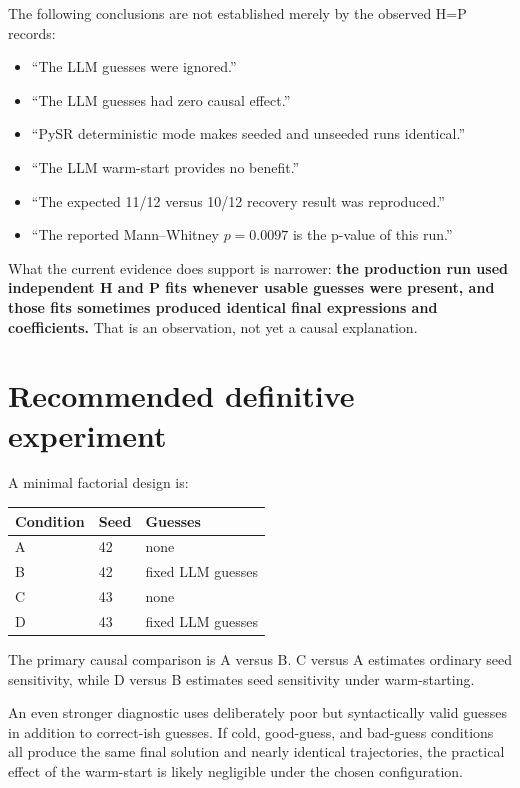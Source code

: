 \documentclass[11pt]{article}
\begin{document}
The following conclusions are not established merely by the observed H=P records:
\begin{itemize}
    \item ``The LLM guesses were ignored.''
    \item ``The LLM guesses had zero causal effect.''
    \item ``PySR deterministic mode makes seeded and unseeded runs identical.''
    \item ``The LLM warm-start provides no benefit.''
    \item ``The expected 11/12 versus 10/12 recovery result was reproduced.''
    \item ``The reported Mann--Whitney \(p=0.0097\) is the p-value of this run.''
\end{itemize}

What the current evidence does support is narrower: \textbf{the production run used independent H and P fits whenever usable guesses were present, and those fits sometimes produced identical final expressions and coefficients.} That is an observation, not yet a causal explanation.

\section{Recommended definitive experiment}

A minimal factorial design is:

\begin{center}
\begin{tabular}{lll}
\toprule
Condition & Seed & Guesses \\
\midrule
A & 42 & none \\
B & 42 & fixed LLM guesses \\
C & 43 & none \\
D & 43 & fixed LLM guesses \\
\bottomrule
\end{tabular}
\end{center}

The primary causal comparison is A versus B. C versus A estimates ordinary seed sensitivity, while D versus B estimates seed sensitivity under warm-starting.

An even stronger diagnostic uses deliberately poor but syntactically valid guesses in addition to correct-ish guesses. If cold, good-guess, and bad-guess conditions all produce the same final solution and nearly identical trajectories, the practical effect of the warm-start is likely negligible under the chosen configuration.
\end{document}
